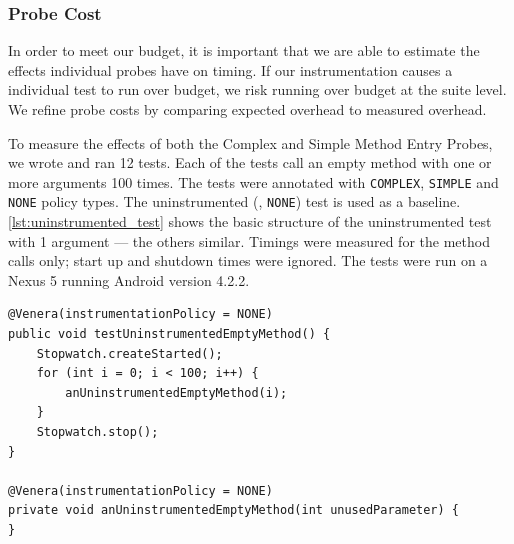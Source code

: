 {\begin{center}
\begin{tabular}{| l | p{6cm} |}
    \end{tabular}
\end{center}

\subsubsection{Probe Cost}
\label{sec:sec:probe_cost}

In order to meet our budget, it is important that we are able to estimate the
effects individual probes have on timing. If our instrumentation causes a
individual test to run over budget, we risk running over budget at the suite
level. We refine probe costs by comparing expected overhead to measured
overhead.

To measure the effects of both the Complex and Simple Method Entry Probes, we
wrote and ran 12 tests. Each of the tests call an empty method with one or more
arguments 100 times. The tests were annotated with {\tt COMPLEX}, {\tt SIMPLE}
and {\tt NONE} policy types. The uninstrumented (\ie, {\tt NONE}) test is used
as a baseline. \autoref{lst:uninstrumented_test} shows the basic structure of
the uninstrumented test with 1 argument --- the others similar. Timings were
measured for the method calls only; start up and shutdown times were ignored.
The tests were run on a Nexus 5 running Android version 4.2.2.

\begin{lstlisting}[caption=Uninstrumented Test,label=lst:uninstrumented_test]
@Venera(instrumentationPolicy = NONE)
public void testUninstrumentedEmptyMethod() {
	Stopwatch.createStarted();
	for (int i = 0; i < 100; i++) {
		anUninstrumentedEmptyMethod(i);
	}
	Stopwatch.stop();
}

@Venera(instrumentationPolicy = NONE)
private void anUninstrumentedEmptyMethod(int unusedParameter) {
}
\end{lstlisting}

\begin{figure}[h]

\centering
{}


\end{figure}}

